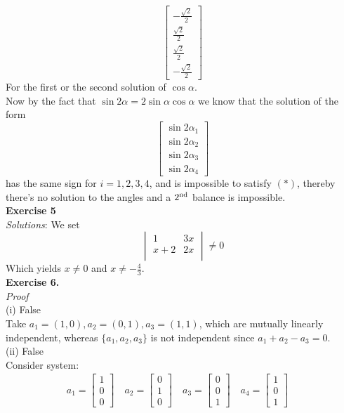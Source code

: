 \documentclass[12pt]{article}
\def\ff#1#2{\frac{#1}{#2}}
\def\sedb{$2^{\rm nd}$ }
\begin{document}
{\[\begin{bmatrix}
-\ff{\sqrt2}{2}\\
\ff{\sqrt2}{2}\\
\ff{\sqrt2}{2}\\
-\ff{\sqrt2}{2}
\end{bmatrix}
\]
For the first or the second solution of $\cos\alpha$.\\
Now by the fact that $\sin{2\alpha}=2\sin{\alpha}\cos{\alpha}$ we know that the solution of the form
\[
\begin{bmatrix}
\sin2\alpha_1\\
\sin2\alpha_2\\
\sin2\alpha_3\\
\sin2\alpha_4
\end{bmatrix}
\]
has the same sign for $i=1,2,3,4$, and is impossible to satisfy $(*)$,
thereby there's no solution to the angles and a \sedb balance is impossible.\\
}
{\bf Exercise 5}\\
{\it Solutions}:
We set
\[
\begin{vmatrix}
1 & 3x \\ 
x+2 & 2x\\ 
\end{vmatrix}
\neq0
\]
Which yields $x\neq 0$ and $x\neq -\frac{4}{3}$.\\
[1em]
{\bf Exercise 6.}\\
{\it Proof}\\
(i) False\\
Take $a_1 = (1,0), a_2 = (0,1), a_3 = (1,1)$, which are mutually linearly independent, whereas $\{a_1,a_2,a_3\}$ is not independent since $a_1+a_2-a_3=0$.\\[0.5 em]
(ii) False\\
Consider system:
\begin{align*}
a_1=
\begin{bmatrix}
1\\
0\\
0
\end{bmatrix}
\quad
a_2=
\begin{bmatrix}
0\\
1\\
0
\end{bmatrix}
\quad
a_3=
\begin{bmatrix}
0\\
0\\
1
\end{bmatrix}
\quad
a_4=
\begin{bmatrix}
1\\
0\\
1
\end{bmatrix}
\quad
\end{align*}
\end{document}
